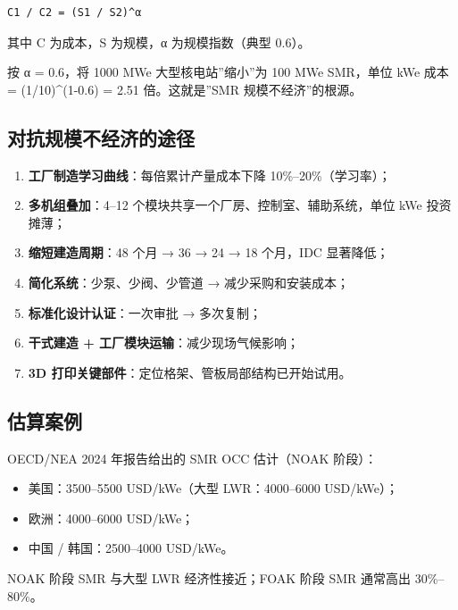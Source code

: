 \documentclass[
  UTF8,
  scheme=plain,
  fontsize=10pt,
  openany
]{ctexbook}
\begin{document}
\begin{verbatim}C1 / C2 = (S1 / S2)^α\end{verbatim}

其中 C 为成本，S 为规模，α 为规模指数（典型 0.6）。

按 α = 0.6，将 1000 MWe 大型核电站''缩小''为 100 MWe SMR，单位 kWe 成本
= (1/10)\^{}(1-0.6) = 2.51 倍。这就是''SMR 规模不经济''的根源。

\subsection{对抗规模不经济的途径}\label{ux5bf9ux6297ux89c4ux6a21ux4e0dux7ecfux6d4eux7684ux9014ux5f84}

\begin{enumerate}
\def\labelenumi{\arabic{enumi}.}
\tightlist
\item
  \textbf{工厂制造学习曲线}：每倍累计产量成本下降 10\%--20\%（学习率）；
\item
  \textbf{多机组叠加}：4--12 个模块共享一个厂房、控制室、辅助系统，单位
  kWe 投资摊薄；
\item
  \textbf{缩短建造周期}：48 个月 → 36 → 24 → 18 个月，IDC 显著降低；
\item
  \textbf{简化系统}：少泵、少阀、少管道 → 减少采购和安装成本；
\item
  \textbf{标准化设计认证}：一次审批 → 多次复制；
\item
  \textbf{干式建造 + 工厂模块运输}：减少现场气候影响；
\item
  \textbf{3D 打印关键部件}：定位格架、管板局部结构已开始试用。
\end{enumerate}

\subsection{估算案例}\label{ux4f30ux7b97ux6848ux4f8b}

OECD/NEA 2024 年报告给出的 SMR OCC 估计（NOAK 阶段）：

\begin{itemize}
\tightlist
\item
  美国：3500--5500 USD/kWe（大型 LWR：4000--6000 USD/kWe）；
\item
  欧洲：4000--6000 USD/kWe；
\item
  中国 / 韩国：2500--4000 USD/kWe。
\end{itemize}

NOAK 阶段 SMR 与大型 LWR 经济性接近；FOAK 阶段 SMR 通常高出 30\%--80\%。
\end{document}
